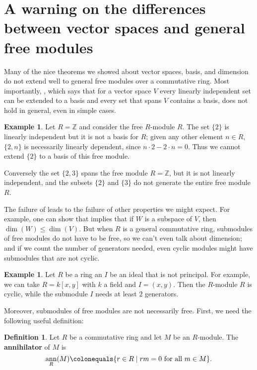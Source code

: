 \documentclass[12pt]{report}
\numberwithin{equation}{section}
\numberwithin{theorem}{chapter}
\theoremstyle{definition}
\newtheorem{definition}[theorem]{Definition}
\newtheorem{example}[theorem]{Example}
\newtheorem*{basic properties}{Basic Properties}
\newtheorem*{Important Remark}{Important Remark}
\newcommand{\df}[1]{{\bf #1}\index{#1}}
\DeclareMathOperator{\ann}{ann}
\begin{document}
\section{A warning on the differences between vector spaces and general free modules}

Many of the nice theorems we showed about vector spaces, basis, and dimension do not extend well to general free modules over a commutative ring. Most importantly, , which says that for a vector space $V$ every linearly independent set can be extended to a basis and every set that spans $V$ contains a basis, does not hold in general, even in simple cases.

\begin{example}
	Let $R = \mathbb{Z}$ and consider the free $R$-module $R$. The set $\{ 2 \}$ is linearly independent but it is not a basis for $R$; given any other element $n \in R$, $\{ 2, n \}$ is necessarily linearly dependent, since $n \cdot 2 - 2 \cdot n = 0$. Thus we cannot extend $\{ 2 \}$ to a basis of this free module.
	
	Conversely the set $\{2, 3 \}$ spans the free module $R = \mathbb{Z}$, but it is not linearly independent, and the subsets $\{ 2 \}$ and $\{ 3 \}$ do not generate the entire free module $R$.
\end{example}


The failure of  leads to the failure of other properties we might expect. For example, one can show that  implies that if $W$ is a subspace of $V$, then $\dim(W) \leqslant \dim(V)$. But when $R$ is a general commutative ring, submodules of free modules do not have to be free, so we can't even talk about dimension; and if we count the number of generators needed, even cyclic modules might have submodules that are not cyclic.

\begin{example}
	Let $R$ be a ring an $I$ be an ideal that is not principal. For example, we can take $R = k[x,y]$ with $k$ a field and $I = (x,y)$. Then the $R$-module $R$ is cyclic, while the submodule $I$ needs at least $2$ generators.
\end{example}

Moreover, submodules of free modules are not necessarily free. First, we need the following useful definition:

\begin{definition}
	Let $R$ be a commutative ring and let $M$ be an $R$-module. The \df{annihilator} of $M$ is
	$$\ann_R(M) \colonequals \{ r \in R \mid rm = 0 \text{ for all } m \in M \}.$$
\end{definition}
\end{document}
